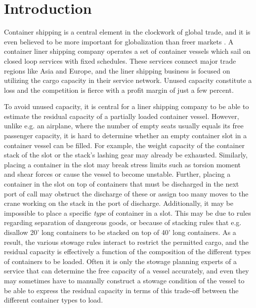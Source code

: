 


  
\maketitle

\section{Introduction}
Container shipping is a central element in the clockwork of global trade, and it is even believed to be more important for globalization than freer markets \cite{EC13}. A container liner shipping company operates a set of container vessels which sail on closed loop services with fixed schedules. These services connect major trade regions like Asia and Europe, and the liner shipping business is focused on utilizing the cargo capacity in their service network. Unused capacity constitute a loss and the competition is fierce with a profit margin of just a few percent.  

To avoid unused capacity, it is central for a liner shipping company to be able to estimate the residual capacity of a partially loaded container vessel. However, unlike e.g. an airplane, where the number of empty seats usually equals its free passenger capacity, it is hard to determine whether an empty container slot in a container vessel can be filled.   
For example, the weight capacity of the container stack of the slot or the stack's lashing gear may already be exhausted. 
Similarly, placing a container in the slot may break stress limits such as torsion moment and shear forces or cause the vessel to become unstable.
Further, placing a container in the slot on top of containers that must be discharged in the next port of call may obstruct the discharge of these or assign too many moves to the crane working on the stack in the port of discharge. 
Additionally,  
it may be impossible to place a specific \emph{type} of container in a slot. This may be due to rules regarding separation of dangerous goods, or because of stacking rules that e.g. disallow 20' long containers to be stacked on top of 40' long containers. 
As a result, the various stowage rules interact to restrict the permitted cargo, and the residual capacity is  effectively a function of the composition of the different types of containers to be loaded.
Often it is only the stowage planning experts of a service that can determine the free capacity of a vessel accurately, and even they may sometimes have to manually construct a stowage condition of the vessel to be able to express the residual capacity in terms of this trade-off between the different container types to load.

